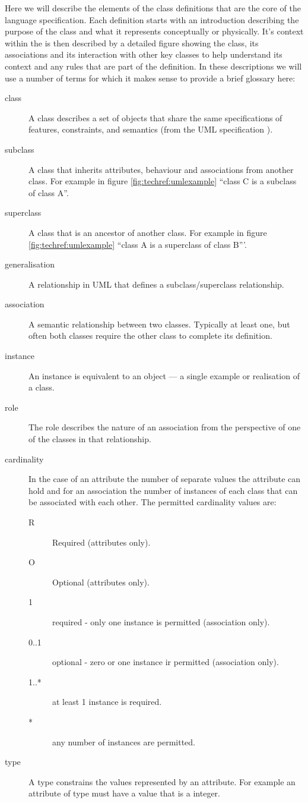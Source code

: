 Here we will describe the elements of the class definitions that are
the core of the language specification. Each definition starts with an
introduction describing the purpose of the class and what it
represents conceptually or physically. It's context within the \PDl is then described by a detailed figure showing the class, its
associations and its interaction with other key classes to help
understand its context and any rules that are part of the
definition. In these descriptions we will use a number of terms for
which it makes sense to provide a brief glossary here:
\begin{description}
\item[class] A class describes a set of objects that share the same
  specifications of features, constraints, and semantics (from the UML
  specification \cite{umlspec}).
\item[subclass] A class that inherits attributes, behaviour and
  associations from another class. For example in figure
  \ref{fig:techref:umlexample} ``class C is a subclass of class A''.
\item[superclass] A class that is an ancestor of another class. For
  example in figure \ref{fig:techref:umlexample} ``class A is a superclass of class B'''.
\item[generalisation] A relationship in UML that defines a
  subclass/superclass relationship.
\item[association] A semantic relationship between two
  classes. Typically at least one, but often both classes require the
  other class to complete its definition.
\item[instance] An instance is equivalent to an object --- a single
  example or realisation of a class.
\item[role] The role describes the nature of an association from the
  perspective of one of the classes in that relationship.
\item[cardinality] In the case of an attribute the number of separate
  values the attribute can hold and for an association the number of
  instances of each class that can be associated with each other. The
  permitted cardinality values are:
  \begin{description}
  \item[R] Required (attributes only).
  \item[O] Optional (attributes only).
  \item[1] required - only one instance is permitted (association only).
  \item[0..1] optional -  zero or one instance ir permitted (association only).
  \item[1..*] at least 1 instance is required.
  \item[*] any number of instances are permitted.
  \end{description}
\item[type] A type constrains the values represented by an
  attribute. For example an attribute of type  must have a
  value that is a integer.
\end{description}
